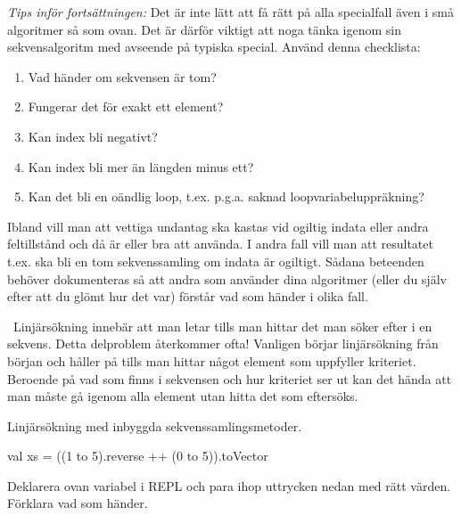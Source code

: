\ifPreSolution
\begin{framed}
\noindent\emph{Tips inför fortsättningen:} Det är inte lätt att få rätt på alla specialfall även i små algoritmer så som  ovan. Det är därför viktigt att noga tänka igenom sin sekvensalgoritm med avseende på typiska special. Använd denna checklista:
\begin{enumerate}[noitemsep]
  \item Vad händer om sekvensen är tom?
  \item Fungerar det för exakt ett element?
  \item Kan index bli negativt?
  \item Kan index bli mer än längden minus ett?
  \item Kan det bli en oändlig loop, t.ex. p.g.a. saknad loopvariabeluppräkning?
\end{enumerate}
Ibland vill man att vettiga undantag ska kastas vid ogiltig indata eller andra feltillstånd och då är  eller  bra att använda. I andra fall vill man att resultatet t.ex. ska bli en tom sekvenssamling om indata är ogiltigt. Sådana beteenden behöver dokumenteras så att andra som använder dina algoritmer (eller du själv efter att du glömt hur det var) förstår vad som händer i olika fall.


\end{framed}
\fi





\QUESTBEGIN

\Task \what~Linjärsökning innebär att man letar tills man hittar det man söker efter i en sekvens. Detta delproblem återkommer ofta! Vanligen börjar linjärsökning från början och håller på tills man hittar något element som uppfyller kriteriet. Beroende på vad som finns i sekvensen och hur kriteriet ser ut kan det hända att man måste gå igenom alla element utan hitta det som eftersöks.

\Subtask Linjärsökning med inbyggda sekvenssamlingsmetoder.
\begin{Code}
val xs = ((1 to 5).reverse ++ (0 to 5)).toVector
\end{Code}
Deklarera ovan variabel i REPL och para ihop uttrycken nedan med rätt värden. Förklara vad som händer.

\begin{ConceptConnections}

\end{ConceptConnections}

